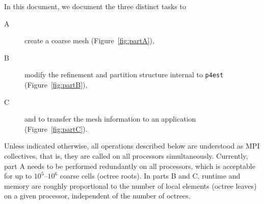 \documentclass[letterpaper,11pt]{article}
\newcommand{\pforest}{\texttt{p4est}\xspace}
\newcommand{\figref}[1]{Figure~\ref{fig:#1}}
\begin{document}
In this document, we document the three distinct tasks to
\begin{description}
\item[A] create a coarse mesh (\figref{partA}),
\item[B] modify the refinement and partition structure internal to \pforest
  (\figref{partB}),
\item[C] and to transfer the mesh information to an application (\figref{partC}).
\end{description}
Unless indicated otherwise, all operations described below are understood as
MPI collectives, that is, they are called on all processors simultaneously.
Currently, part A needs to be performed redundantly on all processors, which is
acceptable for up to $10^5$--$10^6$ coarse cells (octree roots).  In parts B
and C, runtime and memory are roughly proportional to the number of local
elements (octree leaves) on a given processor, independent of the number of
octrees.
\end{document}
